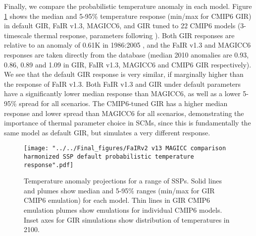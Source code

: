\documentclass[gmd, manuscript]{copernicus}
\begin{document}
Finally, we compare the probabilistic temperature anomaly in each model. Figure \ref{fig:SSPtemps} shows the median and 5-95\% temperature response (min/max for CMIP6 GIR) in default GIR, FaIR v1.3, MAGICC6, and GIR tuned to 22 CMIP6 models (3-timescale thermal response, parameters following \cite{Tsutsui2019}). Both GIR responses are relative to an anomaly of 0.61K in 1986:2005 \citep{Kirtman2013}, and the FaIR v1.3 and MAGICC6 responses are taken directly from the database (median 2010 anomalies are 0.93, 0.86, 0.89 and 1.09 in GIR, FaIR v1.3, MAGICC6 and CMIP6 GIR respectively). We see that the default GIR response is very similar, if marginally higher than the response of FaIR v1.3. Both FaIR v1.3 and GIR under default parameters have a significantly lower median response than MAGICC6, as well as a lower 5-95\% spread for all scenarios. The CMIP6-tuned GIR has a higher median response and lower spread than MAGICC6 for all scenarios, demonstrating the importance of thermal parameter choice in SCMs, since this is fundamentally the same model as default GIR, but simulates a very different response.
\begin{figure}[t]
    \texttt{[image: "../../Final\_figures/FaIRv2 v13 MAGICC comparison harmonized SSP default probabilistic temperature response".pdf]}
    \caption{Temperature anomaly projections for a range of SSPs. Solid lines and plumes show median and 5-95\% ranges (min/max for GIR CMIP6 emulation) for each model. Thin lines in GIR CMIP6 emulation plumes show emulations for individual CMIP6 models. Inset axes for GIR simulations show distribution of temperatures in 2100.}
    \label{fig:SSPtemps}
\end{figure}
\end{document}
